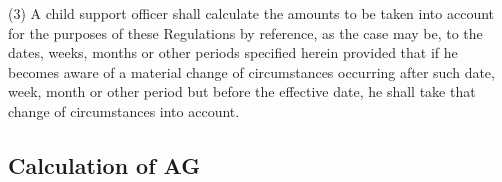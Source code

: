 \documentclass[12pt,a4paper]{article}
\begin{document}
(3) A child support officer shall calculate the amounts to be taken into account for the purposes of these Regulations by reference, as the case may be, to the dates, weeks, months or other periods specified herein provided that if he becomes aware of a material change of circumstances occurring after such date, week, month or other period but before the effective date, he shall take that change of circumstances into account.


\subsection[3. Calculation of AG]{Calculation of AG}
\end{document}
